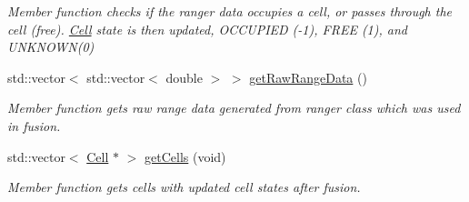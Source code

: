 \begin{DoxyCompactItemize}
\begin{DoxyCompactList}\small\item\em Member function checks if the ranger data occupies a cell, or passes through the cell (free). \hyperlink{classCell}{Cell} state is then updated, O\+C\+C\+U\+P\+I\+ED (-\/1), F\+R\+EE (1), and U\+N\+K\+N\+O\+W\+N(0) \end{DoxyCompactList}\item 
std\+::vector$<$ std\+::vector$<$ double $>$ $>$ \hyperlink{classRangerFusion_a5780383fdffe121a7a2372a047819ba9}{get\+Raw\+Range\+Data} ()
\begin{DoxyCompactList}\small\item\em Member function gets raw range data generated from ranger class which was used in fusion. \end{DoxyCompactList}\item 
std\+::vector$<$ \hyperlink{classCell}{Cell} $\ast$ $>$ \hyperlink{classRangerFusion_ad50617885caf58465966d9a6c9c56713}{get\+Cells} (void)
\begin{DoxyCompactList}\small\item\em Member function gets cells with updated cell states after fusion. \end{DoxyCompactList}\end{DoxyCompactItemize}
